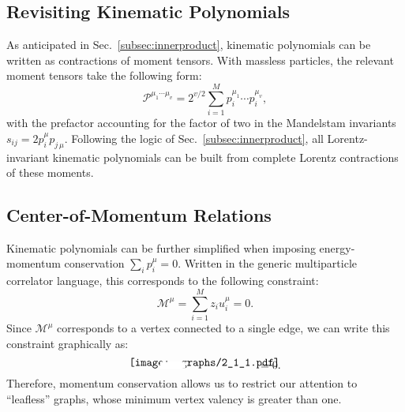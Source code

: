 \documentclass[aps,prd,floatfix,preprintnumbers,twocolumn,groupedaddress,nofootinbib,longbibliography,10pt]{revtex4-1}
\DeclareRobustCommand{\Sec}[1]{Sec.~\ref{#1}}
\begin{document}
\subsection{Revisiting Kinematic Polynomials}
\label{subsec:revisit_kinepoly}


As anticipated in \Sec{subsec:innerproduct}, kinematic polynomials can be written as contractions of moment tensors.
%
With massless particles, the relevant moment tensors take the following form:
%
\begin{equation}
\mathcal P^{\mu_1 \cdots \mu_v} = 2^{v/2}\sum_{i=1}^M p_i^{\mu_1} \cdots p_i^{\mu_v},
\end{equation}
%
with the prefactor accounting for the factor of two in the Mandelstam invariants $s_{ij} = 2 p_i^\mu p_{j\,\mu}$.
%
Following the logic of \Sec{subsec:innerproduct}, all Lorentz-invariant kinematic polynomials can be built from complete Lorentz contractions of these moments.


\subsection{Center-of-Momentum Relations}


Kinematic polynomials can be further simplified when imposing energy-momentum conservation $\sum_i p_i^\mu = 0$.
%
Written in the generic multiparticle correlator language, this corresponds to the following constraint:
%
\begin{equation}
\mathcal M^\mu = \sum_{i=1}^Mz_i u_i^\mu =  0.
\end{equation}
%
Since $\mathcal M^\mu$ corresponds to a vertex connected to a single edge, we can write this constraint graphically as:
%
\begin{equation}
\label{eq:graphical_conservation}
\begin{tikzpicture}[      
        every node/.style={anchor=south west,inner sep=0pt},
        x=1mm, y=1mm,
      ]   
     \node (fig2) at (3,3)
       {\texttt{[image: graphs/2\_1\_1.pdf]}};  
     \draw [fill=patchcolor,patchcolor] (13, 3) rectangle (21, 5);
\end{tikzpicture} \hspace{-7mm}= 0.
\end{equation}
%
Therefore, momentum conservation allows us to restrict our attention to ``leafless'' graphs, whose minimum vertex valency is greater than one.
\end{document}
